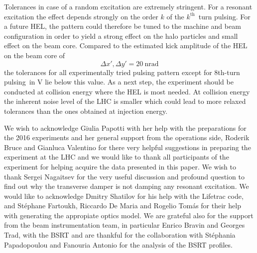 \documentclass[%
 reprint,
 amsmath,amssymb,
 aps,
prstab,
longbibliography
]{revtex4-1}
\newcommand{\eighthtp}{8th-turn pulsing}
\begin{document}
Tolerances in case of a random excitation are extremely stringent. For a resonant excitation the effect depends strongly on the order $k$ of the $k^{\mathrm{th}}$~turn pulsing. For a future HEL, the pattern could therefore be tuned to the machine and beam configuration in order to yield a strong effect on the halo particles and small effect on the beam core. Compared to the estimated kick amplitude of the HEL on the beam core of
\begin{equation}
\Delta x', \Delta y' = 20 \ \mathrm{nrad}
\end{equation}
the tolerances for all experimentally tried pulsing pattern except for \eighthtp\ in V lie below this value. As a next step, the experiment should be conducted at collision energy where the HEL is most needed. At collision energy the inherent noise level of the LHC is smaller which could lead to more relaxed tolerances than the ones obtained at injection energy.



\begin{acknowledgments}
We wish to acknowledge Giulia Papotti with her help with the preparations for the 2016 experiments and her general support from the operations side, Roderik Bruce and Gianluca Valentino for there very helpful suggestions in preparing the experiment at the LHC and we would like to thank all participants of the experiment for helping acquire the data presented in this paper. We wish to thank Sergei Nagaitsev for the very useful discussion and profound question to find out why the transverse damper is not damping any resonant excitation. We would like to acknowledge Dmitry Shatilov for his help with the Lifetrac code, and St\'{e}phane Fartoukh, Riccardo De Maria and Rogelio Tom\'as for their help with generating the appropiate optics model. We are grateful also for the support from the beam instrumentation team, in particular Enrico Bravin and Georges Trad, with the BSRT and are thankful for the collaboration with St\'{e}phania Papadopoulou and Fanouria Antonio for the analysis of the BSRT profiles.
\end{acknowledgments}


\appendix
\end{document}
